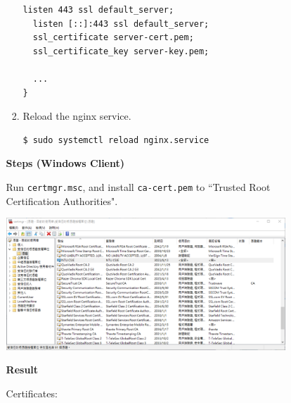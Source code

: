 \documentclass[12pt, a4paper]{article}
\begin{document}
\begin{enumerate}[resume]
\begin{enumerate}
\begin{enumerate}[label=(\arabic*)]
\begin{Verbatim}[frame=single]
  listen 443 ssl default_server;
  listen [::]:443 ssl default_server;
  ssl_certificate server-cert.pem;
  ssl_certificate_key server-key.pem;

  ...
}
        \end{Verbatim}
        \item Reload the nginx service.
        \begin{Verbatim}[frame=single]
$ sudo systemctl reload nginx.service
        \end{Verbatim}
      \end{enumerate}

      \textbf{Steps (Windows Client)}

      Run \verb|certmgr.msc|, and install \verb|ca-cert.pem| to
      ``Trusted Root Certification Authorities".

      \includegraphics[width=0.87\textwidth]{12-c_certmgr.png}

      \textbf{Result}

      Certificates:


\end{enumerate}
\end{enumerate}
\end{document}

